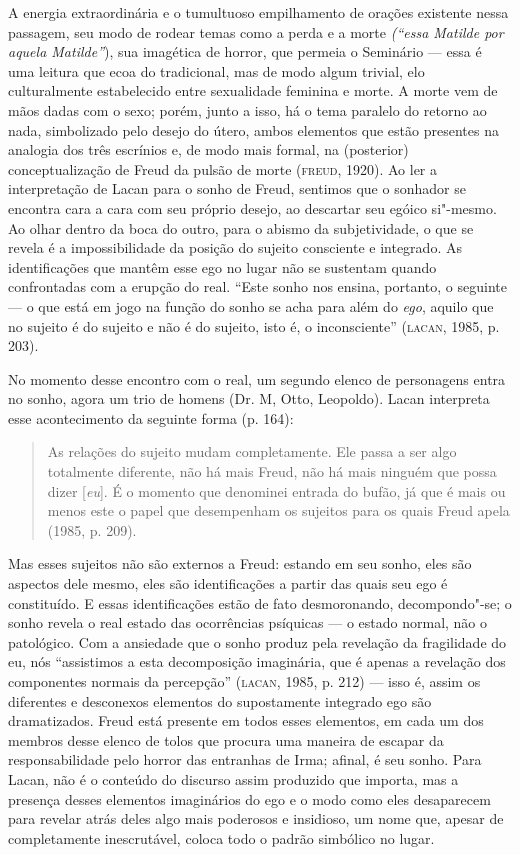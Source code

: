 A energia extraordinária e o tumultuoso empilhamento de orações
existente nessa passagem, seu modo de rodear temas como a perda e a
morte \emph{(``essa Matilde por aquela Matilde''}), sua imagética de
horror, que permeia o Seminário --- essa é uma leitura que ecoa do
tradicional, mas de modo algum trivial, elo culturalmente estabelecido
entre sexualidade feminina e morte. A morte vem de mãos dadas com o
sexo; porém, junto a isso, há o tema paralelo do retorno ao nada,
simbolizado pelo desejo do útero, ambos elementos que estão presentes na
analogia dos três escrínios e, de modo mais formal, na (posterior)
conceptualização de Freud da pulsão de morte (\textsc{freud}, 1920). Ao ler a
interpretação de Lacan para o sonho de Freud, sentimos que o sonhador se
encontra cara a cara com seu próprio desejo, ao descartar seu egóico
si"-mesmo. Ao olhar dentro da boca do outro, para o abismo da
subjetividade, o que se revela é a impossibilidade da posição do sujeito
consciente e integrado. As identificações que mantêm esse ego no lugar
não se sustentam quando confrontadas com a erupção do real. ``Este sonho
nos ensina, portanto, o seguinte --- o que está em jogo na função do sonho
se acha para além do \emph{ego}, aquilo que no sujeito é do sujeito e
não é do sujeito, isto é, o inconsciente'' (\textsc{lacan}, 1985, p. 203).

No momento desse encontro com o real, um segundo elenco de personagens
entra no sonho, agora um trio de homens (Dr. M, Otto, Leopoldo). Lacan
interpreta esse acontecimento da seguinte forma (p. 164):

\begin{quote}
As relações do sujeito mudam completamente. Ele passa a ser algo
totalmente diferente, não há mais Freud, não há mais ninguém que possa
dizer {[}\emph{eu}{]}. É o momento que denominei entrada do bufão, já
que é mais ou menos este o papel que desempenham os sujeitos para os
quais Freud apela (1985, p. 209).
\end{quote}

Mas esses sujeitos não são externos a Freud: estando em seu sonho, eles
são aspectos dele mesmo, eles são identificações a partir das quais seu
ego é constituído. E essas identificações estão de fato desmoronando,
decompondo"-se; o sonho revela o real estado das ocorrências psíquicas ---
o estado normal, não o patológico. Com a ansiedade que o sonho produz
pela revelação da fragilidade do eu, nós ``assistimos a esta
decomposição imaginária, que é apenas a revelação dos componentes
normais da percepção'' (\textsc{lacan}, 1985, p. 212) --- isso é, assim os
diferentes e desconexos elementos do supostamente integrado ego são
dramatizados. Freud está presente em todos esses elementos, em cada um
dos membros desse elenco de tolos que procura uma maneira de escapar da
responsabilidade pelo horror das entranhas de Irma; afinal, é seu sonho.
Para Lacan, não é o conteúdo do discurso assim produzido que importa,
mas a presença desses elementos imaginários do ego e o modo como eles
desaparecem para revelar atrás deles algo mais poderosos e insidioso, um
nome que, apesar de completamente inescrutável, coloca todo o padrão
simbólico no lugar.

